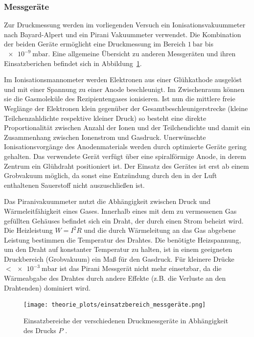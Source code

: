 \subsubsection{Messgeräte}
Zur Druckmessung werden im vorliegenden Versuch ein Ionisationsvakuummeter nach Bayard-Alpert und ein Pirani Vakuummeter verwendet.
Die Kombination der beiden Geräte ermöglicht eine Druckmessung im Bereich $\SI{1}{\bar}$ bis $\SI{e-9}{\milli\bar}$.
Eine allgemeine Übersicht zu anderen Messgeräten und ihren Einsatzberichen befindet sich in Abbildung~\ref{fig: messgeräte}.

Im Ionisationsmannometer werden Elektronen aus einer Glühkathode ausgelöst und mit einer Spannung zu einer Anode beschleunigt.
Im Zwischenraum können sie die
Gasmoleküle des Rezipientengases ionisieren. Ist nun die mittlere freie Weglänge der Elektronen klein gegenüber der
Gesamtbeschleunigerstrecke (kleine Teilchenzahldichte respektive kleiner Druck) so besteht eine direkte Proportionalität
zwischen Anzahl der Ionen und der Teilchendichte und damit ein Zusammenhang zwischen Ionenstrom und Gasdruck. Unerwünschte
Ionisationsvorgänge des Anodenmaterials werden durch optimierte Geräte gering gehalten. Das verwendete Gerät verfügt über
eine spiralförmige Anode, in derem Zentrum ein Glühdraht positioniert ist. Der Einsatz des Gerätes ist erst ab einem %
Grobvakuum möglich, da sonst eine Entzündung durch den in der Luft enthaltenen Sauerstoff nicht auszuschließen ist.

Das Piranivakuummeter nutzt die Abhängigkeit zwischen Druck und Wärmeleitfähigkeit eines Gases. Innerhalb eines mit dem
zu vermessenen Gas gefüllten Gehäuses befindet sich ein Draht, der durch einen Strom beheizt wird. Die Heizleistung
$W = I^2 R$ und die durch Wärmeleitung an das Gas abgebene Leistung bestimmen die Temperatur des Drahtes. Die benötigte %
Heizspannung, um den Draht auf konstanter Temperatur zu halten, ist in einem geeigneten Druckbereich (Grobvakuum)
ein Maß für den Gasdruck. Für kleinere Drücke $<\SI{e-3}{\milli\bar}$ ist das Pirani Messgerät nicht mehr einsetzbar, da die
Wärmeabgabe des Drahtes durch andere Effekte (z.B. die Verluste an den Drahtenden) dominiert wird.

\begin{figure}
  \centering
  \texttt{[image: theorie\_plots/einsatzbereich\_messgeräte.png]}
  \caption{Einsatzbereiche der verschiedenen Druckmessgeräte in Abhängigkeit des Drucks $P$ \cite{dem1}.}
  \label{fig: messgeräte}
\end{figure}
\FloatBarrier
